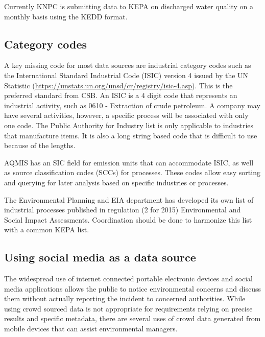 Currently KNPC is submitting data to KEPA on discharged water quality on a monthly basis using the KEDD format.

\subsection{Category codes}

A key missing code for most data sources are industrial category codes such as the International Standard Industrial Code (ISIC) version 4 issued by the UN Statistic (\url{https://unstats.un.org/unsd/cr/registry/isic-4.asp}). This is the preferred standard from CSB. An ISIC is a 4 digit code that represents an industrial activity, such as 0610 - Extraction of crude petroleum. A company may have several activities, however, a specific process will be associated with only one code. The Public Authority for Industry list is only applicable to industries that manufacture items. It is also a long string based code that is difficult to use because of the lengths.

AQMIS has an SIC field for emission units that can accommodate ISIC, as well as source classification codes (SCCs) for processes. These codes allow easy sorting and querying for later analysis based on specific industries or processes.

The Environmental Planning and EIA department has developed its own list of industrial processes published in regulation (2 for 2015) Environmental and Social Impact Assessments. Coordination should be done to harmonize this list with a common KEPA list.

\subsection{Using social media as a data source}

The widespread use of internet connected portable electronic devices and social media applications allows the public to notice environmental concerns and discuss them without actually  reporting the incident to concerned authorities. While using crowd sourced data is not appropriate for requirements relying on precise results and specific metadata, there are several uses of crowd data generated from mobile devices that can assist environmental managers. 

